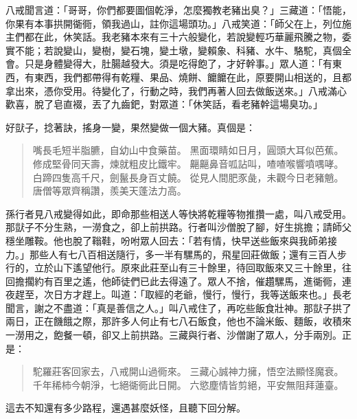 八戒聞言道：「哥哥，你們都要圖個乾淨，怎麼獨教老豬出臭？」三藏道：「悟能，你果有本事拱開衚衕，領我過山，註你這場頭功。」八戒笑道：「師父在上，列位施主們都在此，休笑話。我老豬本來有三十六般變化，若說變輕巧華麗飛騰之物，委實不能；若說變山，變樹，變石塊，變土墩，變賴象、科豬、水牛、駱駝，真個全會。只是身體變得大，肚腸越發大。須是吃得飽了，才好幹事。」眾人道：「有東西，有東西，我們都帶得有乾糧、果品、燒餅、饝饝在此，原要開山相送的，且都拿出來，憑你受用。待變化了，行動之時，我們再著人回去做飯送來。」八戒滿心歡喜，脫了皂直裰，丟了九齒鈀，對眾道：「休笑話，看老豬幹這場臭功。」

好獃子，捻著訣，搖身一變，果然變做一個大豬。真個是：
\begin{quote}
嘴長毛短半脂臕，自幼山中食藥苗。
黑面環睛如日月，圓頭大耳似芭蕉。
修成堅骨同天壽，煉就粗皮比鐵牢。
齆齆鼻音呱詀叫，喳喳喉響噴喁哮。
白蹄四隻高千尺，劍鬣長身百丈饒。
從見人間肥豕彘，未觀今日老豬魈。
唐僧等眾齊稱讚，羨美天蓬法力高。
\end{quote}

孫行者見八戒變得如此，即命那些相送人等快將乾糧等物推攢一處，叫八戒受用。那獃子不分生熟，一澇食之，卻上前拱路。行者叫沙僧脫了腳，好生挑擔；請師父穩坐雕鞍。他也脫了䩺鞋，吩咐眾人回去：「若有情，快早送些飯來與我師弟接力。」那些人有七八百相送隨行，多一半有騾馬的，飛星回莊做飯；還有三百人步行的，立於山下遙望他行。原來此莊至山有三十餘里，待回取飯來又三十餘里，往回擔擱約有百里之遙，他師徒們已此去得遠了。眾人不捨，催趲騾馬，進衚衕，連夜趕至，次日方才趕上。叫道：「取經的老爺，慢行，慢行，我等送飯來也。」長老聞言，謝之不盡道：「真是善信之人。」叫八戒住了，再吃些飯食壯神。那獃子拱了兩日，正在饑餓之際，那許多人何止有七八石飯食，他也不論米飯、麵飯，收積來一澇用之，飽餐一頓，卻又上前拱路。三藏與行者、沙僧謝了眾人，分手兩別。正是：
\begin{quote}
駝羅莊客回家去，八戒開山過衕來。
三藏心誠神力擁，悟空法顯怪魔衰。
千年稀柿今朝淨，七絕衚衕此日開。
六慾塵情皆剪絕，平安無阻拜蓮臺。
\end{quote}

這去不知還有多少路程，還遇甚麼妖怪，且聽下回分解。
